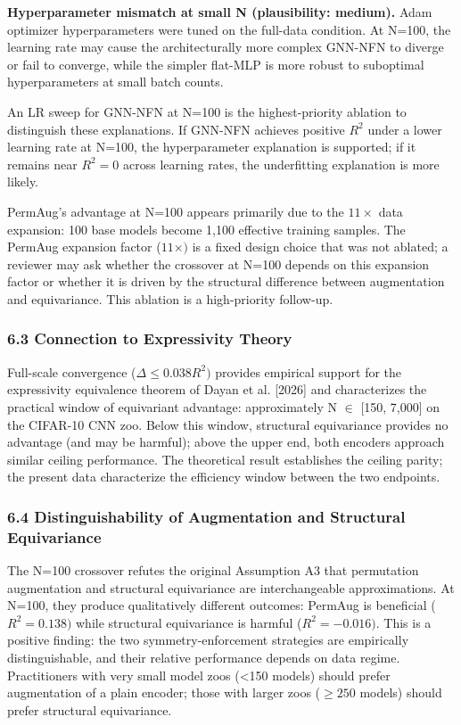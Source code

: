 \textbf{Hyperparameter mismatch at small N (plausibility: medium).} Adam optimizer hyperparameters were tuned on the full-data condition. At N=100, the learning rate may cause the architecturally more complex GNN-NFN to diverge or fail to converge, while the simpler flat-MLP is more robust to suboptimal hyperparameters at small batch counts.

An LR sweep for GNN-NFN at N=100 is the highest-priority ablation to distinguish these explanations. If GNN-NFN achieves positive $R^2$ under a lower learning rate at N=100, the hyperparameter explanation is supported; if it remains near $R^{2}=0$ across learning rates, the underfitting explanation is more likely.

PermAug's advantage at N=100 appears primarily due to the $11\times$ data expansion: 100 base models become 1,100 effective training samples. The PermAug expansion factor ($11\times )$ is a fixed design choice that was not ablated; a reviewer may ask whether the crossover at N=100 depends on this expansion factor or whether it is driven by the structural difference between augmentation and equivariance. This ablation is a high-priority follow-up.

\subsubsection{6.3 Connection to Expressivity Theory}

Full-scale convergence ($\Delta \leq 0.038 R^{2})$ provides empirical support for the expressivity equivalence theorem of Dayan et al. [2026] and characterizes the practical window of equivariant advantage: approximately N $\in$ [150, 7,000] on the CIFAR-10 CNN zoo. Below this window, structural equivariance provides no advantage (and may be harmful); above the upper end, both encoders approach similar ceiling performance. The theoretical result establishes the ceiling parity; the present data characterize the efficiency window between the two endpoints.

\subsubsection{6.4 Distinguishability of Augmentation and Structural Equivariance}

The N=100 crossover refutes the original Assumption A3 that permutation augmentation and structural equivariance are interchangeable approximations. At N=100, they produce qualitatively different outcomes: PermAug is beneficial ($R^{2}=0.138)$ while structural equivariance is harmful ($R^{2}=-0.016)$. This is a positive finding: the two symmetry-enforcement strategies are empirically distinguishable, and their relative performance depends on data regime. Practitioners with very small model zoos (<150 models) should prefer augmentation of a plain encoder; those with larger zoos ($\geq 250$ models) should prefer structural equivariance.


